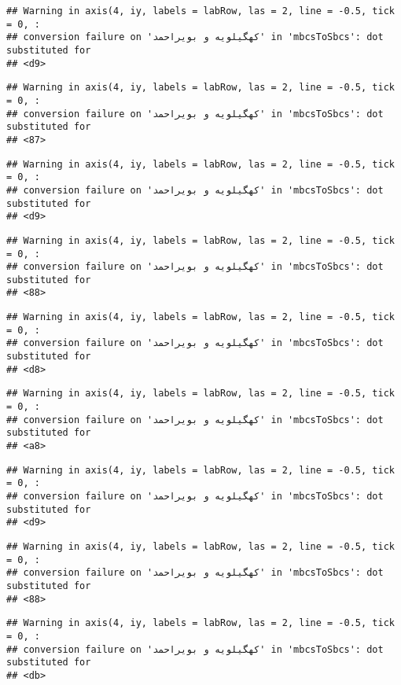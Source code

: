 \documentclass[
]{article}
\begin{document}
\begin{verbatim}
## Warning in axis(4, iy, labels = labRow, las = 2, line = -0.5, tick = 0, :
## conversion failure on 'کهگیلویه و بویراحمد' in 'mbcsToSbcs': dot substituted for
## <d9>
\end{verbatim}

\begin{verbatim}
## Warning in axis(4, iy, labels = labRow, las = 2, line = -0.5, tick = 0, :
## conversion failure on 'کهگیلویه و بویراحمد' in 'mbcsToSbcs': dot substituted for
## <87>
\end{verbatim}

\begin{verbatim}
## Warning in axis(4, iy, labels = labRow, las = 2, line = -0.5, tick = 0, :
## conversion failure on 'کهگیلویه و بویراحمد' in 'mbcsToSbcs': dot substituted for
## <d9>
\end{verbatim}

\begin{verbatim}
## Warning in axis(4, iy, labels = labRow, las = 2, line = -0.5, tick = 0, :
## conversion failure on 'کهگیلویه و بویراحمد' in 'mbcsToSbcs': dot substituted for
## <88>
\end{verbatim}

\begin{verbatim}
## Warning in axis(4, iy, labels = labRow, las = 2, line = -0.5, tick = 0, :
## conversion failure on 'کهگیلویه و بویراحمد' in 'mbcsToSbcs': dot substituted for
## <d8>
\end{verbatim}

\begin{verbatim}
## Warning in axis(4, iy, labels = labRow, las = 2, line = -0.5, tick = 0, :
## conversion failure on 'کهگیلویه و بویراحمد' in 'mbcsToSbcs': dot substituted for
## <a8>
\end{verbatim}

\begin{verbatim}
## Warning in axis(4, iy, labels = labRow, las = 2, line = -0.5, tick = 0, :
## conversion failure on 'کهگیلویه و بویراحمد' in 'mbcsToSbcs': dot substituted for
## <d9>
\end{verbatim}

\begin{verbatim}
## Warning in axis(4, iy, labels = labRow, las = 2, line = -0.5, tick = 0, :
## conversion failure on 'کهگیلویه و بویراحمد' in 'mbcsToSbcs': dot substituted for
## <88>
\end{verbatim}

\begin{verbatim}
## Warning in axis(4, iy, labels = labRow, las = 2, line = -0.5, tick = 0, :
## conversion failure on 'کهگیلویه و بویراحمد' in 'mbcsToSbcs': dot substituted for
## <db>
\end{verbatim}
\end{document}

